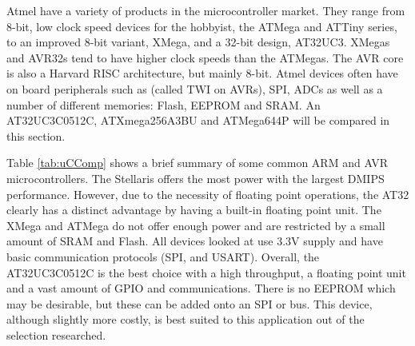 Atmel have a variety of products in the microcontroller market. They range from 8-bit, low clock speed devices for the hobbyist, the ATMega and ATTiny series, to an improved 8-bit variant, XMega, and a 32-bit design, AT32UC3. XMegas and AVR32s tend to have higher clock speeds than the ATMegas. The AVR core is also a Harvard RISC architecture, but mainly 8-bit. Atmel devices often have on board peripherals such as \itc (called TWI on AVRs), SPI, ADCs as well as a number of different memories: Flash, EEPROM and SRAM. An AT32UC3C0512C, ATXmega256A3BU and ATMega644P will be compared in this section. 


Table \ref{tab:uCComp} shows a brief summary of some common ARM and AVR microcontrollers. The Stellaris offers the most power with the largest DMIPS performance. However, due to the necessity of floating point operations, the AT32 clearly has a distinct advantage by having a built-in floating point unit. The XMega and ATMega do not offer enough power and are restricted by a small amount of SRAM and Flash. All devices looked at use 3.3V supply and have basic communication protocols (SPI, \itc and USART). Overall, the AT32UC3C0512C is the best choice with a high throughput, a floating point unit and a vast amount of GPIO and communications. There is no EEPROM which may be desirable, but these can be added onto an SPI or \itc bus. This device, although slightly more costly, is best suited to this application out of the selection researched.

